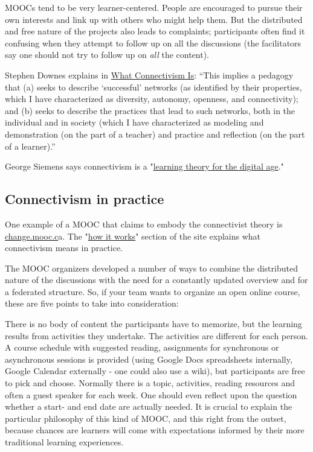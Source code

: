 MOOCs tend to be very learner-centered. People are encouraged to pursue
their own interests and link up with others who might help them. But the
distributed and free nature of the projects also leads to complaints;
participants often find it confusing when they attempt to follow up on
all the discussions (the facilitators say one should not try to follow
up on \emph{all} the content).

Stephen Downes explains in
\href{http://halfanhour.blogspot.com/2007/02/what-connectivism-is.html}{What
Connectivism Is}: ``This implies a pedagogy that (a) seeks to describe
`successful' networks (as identified by their properties, which I have
characterized as diversity, autonomy, openness, and connectivity); and
(b) seeks to describe the practices that lead to such networks, both in
the individual and in society (which I have characterized as modeling
and demonstration (on the part of a teacher) and practice and reflection
(on the part of a learner).''

George Siemens says connectivism is a
"\href{http://www.itdl.org/Journal/Jan\_05/article01.htm}{learning
theory for the digital age}."

\subsection{Connectivism in practice}

One example of a MOOC that claims to embody the connectivist theory is
\href{http://change.mooc.ca/index.html}{change.mooc.c}a. The
"\href{http://change.mooc.ca/how.htm}{how it works}" section of the site
explains what connectivism means in practice.

The MOOC organizers developed a number of ways to combine the
distributed nature of the discussions with the need for a constantly
updated overview and for a federated structure. So, if your team wants
to organize an open online course, these are five points to take into
consideration:

There is no body of content the participants have to memorize, but the
learning results from activities they undertake. The activities are
different for each person. A course schedule with suggested reading,
assignments for synchronous or asynchronous sessions is provided (using
Google Docs spreadsheets internally, Google Calendar externally - one
could also use a wiki), but participants are free to pick and choose.
Normally there is a topic, activities, reading resources and often a
guest speaker for each week. One should even reflect upon the question
whether a start- and end date are actually needed. It is crucial to
explain the particular philosophy of this kind of MOOC, and this right
from the outset, because chances are learners will come with
expectations informed by their more traditional learning experiences.

